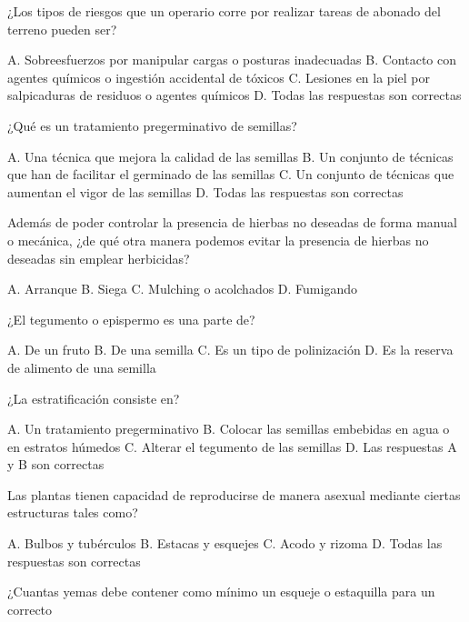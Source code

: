 \documentclass[11pt]{exam}
\begin{document}
{\begin{questions}
\question ¿Los tipos de riesgos que un operario corre por  realizar tareas de abonado del
  terreno pueden ser?
  \begin{checkboxes}
    \choice A. Sobreesfuerzos por manipular cargas o posturas inadecuadas
    \choice B. Contacto con agentes químicos o ingestión accidental de tóxicos
    \choice C. Lesiones en la piel por salpicaduras de residuos o agentes químicos
    \CorrectChoice D. Todas las respuestas son correctas
  \end{checkboxes}
\question ¿Qué es un tratamiento pregerminativo de semillas?
  \begin{checkboxes}
    \choice A. Una técnica que mejora la calidad de las semillas
    \CorrectChoice B. Un conjunto de técnicas que han de facilitar el germinado de las
    semillas
    \choice C. Un conjunto de técnicas que aumentan el vigor de las semillas
    \choice D. Todas las respuestas son correctas
  \end{checkboxes}
\question Además de poder controlar la presencia de hierbas no deseadas de forma manual o
  mecánica, ¿de qué otra manera podemos evitar la presencia de hierbas no deseadas sin
  emplear herbicidas?
  \begin{checkboxes}
    \choice A. Arranque
    \choice B. Siega
    \CorrectChoice C. Mulching o acolchados
    \choice D. Fumigando
  \end{checkboxes}
\question ¿El tegumento o epispermo es una parte de?
  \begin{checkboxes}
    \choice A. De un fruto
    \CorrectChoice B. De una semilla
    \choice C. Es un tipo de polinización
    \choice D. Es la reserva de alimento de una semilla
  \end{checkboxes}
\question ¿La estratificación consiste en?
  \begin{checkboxes}
    \choice A. Un tratamiento pregerminativo
    \choice B. Colocar las semillas embebidas en agua o en estratos húmedos
    \choice C. Alterar el tegumento de las semillas
    \CorrectChoice D. Las respuestas A y B son correctas
  \end{checkboxes}
\question Las plantas tienen capacidad de reproducirse de manera asexual mediante
  ciertas estructuras tales como?
  \begin{checkboxes}
    \CorrectChoice A. Bulbos y tubérculos
    \choice B. Estacas y esquejes
    \choice C. Acodo y rizoma
    \choice D. Todas las respuestas son correctas 
  \end{checkboxes}
\question ¿Cuantas yemas debe contener como mínimo un esqueje o estaquilla para un correcto

\end{questions}}
\end{document}
